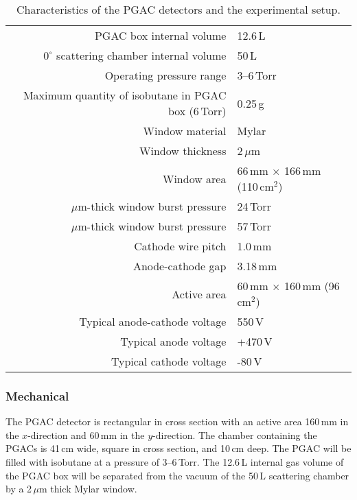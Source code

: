 \begin{table}[t]
\begin{center}
\begin{tabulary}{1.0\textwidth}{R|L} 
\raggedleft PGAC box internal volume & 12.6\,L\\
\raggedleft $0^\circ$ scattering chamber internal volume & 50\,L\\
\raggedleft Operating pressure range&3--6\,Torr\\
\raggedleft Maximum quantity of isobutane in PGAC box (6\,Torr)&0.25\,g\\
\hline
\raggedleft Window material &Mylar\\
\raggedleft Window thickness&2\,$\mu$m\\
\raggedleft Window area& 66\,mm $\times$ 166\,mm (110\,cm$^2$)\\
\,$\mu$m-thick window burst pressure &24\,Torr\\
\,$\mu$m-thick window burst pressure &57\,Torr\\
\hline
\raggedleft Cathode wire pitch&1.0\,mm\\
\raggedleft Anode-cathode gap&3.18\,mm\\
\raggedleft Active area&60\,mm $\times$ 160\,mm (96\,cm$^2$)\\
\hline
\raggedleft Typical anode-cathode voltage &550\,V\\
\raggedleft Typical anode voltage &+470\,V\\
\raggedleft Typical cathode voltage &-80\,V\\
\end{tabulary}
\end{center}
\caption{Characteristics of the PGAC detectors and the experimental setup.}
\label{detector}
\end{table}

\subsubsection{Mechanical}
The PGAC detector is rectangular in cross section with an active area 160\,mm in the $x$-direction and 60\,mm in the $y$-direction. The chamber containing the PGACs is 41\,cm wide, square in cross section, and 10\,cm deep.
The PGAC will be filled with isobutane at a pressure of 3--6\,Torr. The 12.6\,L internal gas volume of the PGAC box will be separated from the vacuum of the 50\,L scattering chamber by a 2\,$\mu$m thick Mylar window. 

